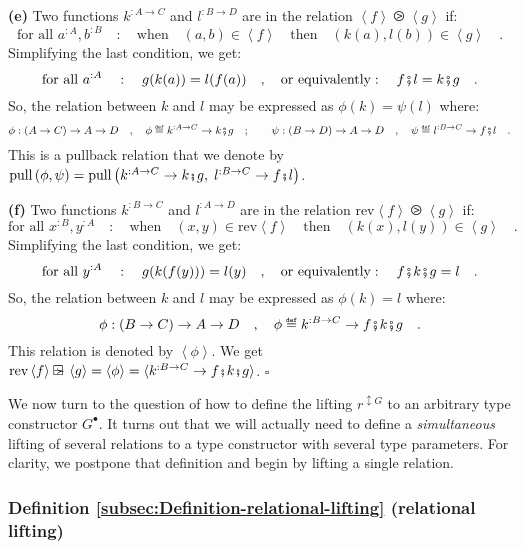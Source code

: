 \textbf{(e)} Two functions $k^{:A\rightarrow C}$ and $l^{:B\rightarrow D}$
are in the relation $\left<f\right>\ogreaterthan\left<g\right>$ if:
\[
\text{for all }a^{:A},b^{:B}\quad:\quad\text{when}\quad(a,b)\in\left<f\right>\quad\text{then}\quad(k(a),l(b))\in\left<g\right>\quad.
\]
Simplifying the last condition, we get:
\[
\text{for all }a^{:A}\quad:\quad g(k(a))=l(f(a))\quad,\quad\text{or equivalently}:\quad f\bef l=k\bef g\quad.
\]
So, the relation between $k$ and $l$ may be expressed as $\phi(k)=\psi(l)$
where: 
\[
\phi:\left(A\rightarrow C\right)\rightarrow A\rightarrow D\quad,\quad\phi\triangleq k^{:A\rightarrow C}\rightarrow k\bef g\quad;\quad\quad\psi:\left(B\rightarrow D\right)\rightarrow A\rightarrow D\quad,\quad\psi\triangleq l^{:B\rightarrow C}\rightarrow f\bef l\quad.
\]
 This is a pullback relation that we denote by $\text{pull}\,(\phi,\psi)=\text{pull}\,\big(k^{:A\rightarrow C}\rightarrow k\bef g,\;l^{:B\rightarrow C}\rightarrow f\bef l\big)$.

\textbf{(f)} Two functions $k^{:B\rightarrow C}$ and $l^{:A\rightarrow D}$
are in the relation $\text{rev}\left<f\right>\ogreaterthan\left<g\right>$
if:
\[
\text{for all }x^{:B},y^{:A}\quad:\quad\text{when}\quad(x,y)\in\text{rev}\left<f\right>\quad\text{then}\quad(k(x),l(y))\in\left<g\right>\quad.
\]
Simplifying the last condition, we get:
\[
\text{for all }y^{:A}\quad:\quad g(k(f(y)))=l(y)\quad,\quad\text{or equivalently}:\quad f\bef k\bef g=l\quad.
\]
So, the relation between $k$ and $l$ may be expressed as $\phi(k)=l$
where: 
\[
\phi:\left(B\rightarrow C\right)\rightarrow A\rightarrow D\quad,\quad\phi\triangleq k^{:B\rightarrow C}\rightarrow f\bef k\bef g\quad.
\]
 This relation is denoted by $\left<\phi\right>$. We get $\text{rev}\left<f\right>\ogreaterthan\left<g\right>=\left<\phi\right>=\langle k^{:B\rightarrow C}\rightarrow f\bef k\bef g\rangle$.
$\square$

We now turn to the question of how to define the lifting $r^{\updownarrow G}$
to an arbitrary type constructor $G^{\bullet}$. It turns out that
we will actually need to define a \emph{simultaneous} lifting of several
relations to a type constructor with several type parameters. For
clarity, we postpone that definition and begin by lifting a single
relation.

\subsubsection{Definition \label{subsec:Definition-relational-lifting}\ref{subsec:Definition-relational-lifting}
(relational lifting)}

